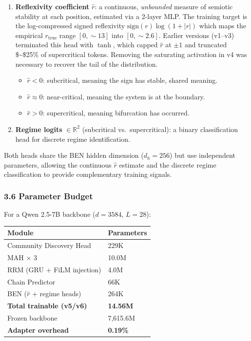 \documentclass[
  11pt]{article}
\newcounter{none} %
\providecommand{\tightlist}{%
  \setlength{\itemsep}{0pt}\setlength{\parskip}{0pt}}
\begin{document}
\begin{enumerate}
\def\labelenumi{\arabic{enumi}.}
\tightlist
\item
  \textbf{Reflexivity coefficient} \(\hat{r}\): a continuous,
  \emph{unbounded} measure of semiotic stability at each position,
  estimated via a 2-layer MLP. The training target is the log-compressed
  signed reflexivity \(\text{sign}(r)\log(1 + |r|)\) which maps the
  empirical \(r_{\text{true}}\) range \([0, \sim 13]\) into
  \([0, \sim 2.6]\). Earlier versions (v1--v3) terminated this head with
  \(\tanh\), which capped \(\hat{r}\) at \(\pm 1\) and truncated
  \$\sim\$25\% of supercritical tokens. Removing the saturating
  activation in v4 was necessary to recover the tail of the
  distribution.

  \begin{itemize}
  \tightlist
  \item
    \(\hat{r} < 0\): subcritical, meaning the sign has stable, shared
    meaning.
  \item
    \(\hat{r} \approx 0\): near-critical, meaning the system is at the
    boundary.
  \item
    \(\hat{r} > 0\): supercritical, meaning bifurcation has occurred.
  \end{itemize}
\item
  \textbf{Regime logits} \(\in \mathbb{R}^2\) (subcritical
  vs.~supercritical): a binary classification head for discrete regime
  identification.
\end{enumerate}

Both heads share the BEN hidden dimension (\(d_h = 256\)) but use
independent parameters, allowing the continuous \(\hat{r}\) estimate and
the discrete regime classification to provide complementary training
signals.

\subsubsection{3.6 Parameter Budget}\label{parameter-budget}

For a Qwen 2.5-7B backbone (\(d = 3584\), \(L = 28\)):

{\def\LTcaptype{none} %
\begin{longtable}[]{@{}ll@{}}
\toprule\noalign{}
Module & Parameters \\
\midrule\noalign{}
\endhead
\bottomrule\noalign{}
\endlastfoot
Community Discovery Head & 229K \\
MAH × 3 & 10.0M \\
RRM (GRU + FiLM injection) & 4.0M \\
Chain Predictor & 66K \\
BEN (\(\hat{r}\) + regime heads) & 264K \\
\textbf{Total trainable (v5/v6)} & \textbf{14.56M} \\
Frozen backbone & 7,615.6M \\
\textbf{Adapter overhead} & \textbf{0.19\%} \\
\end{longtable}
}
\end{document}
